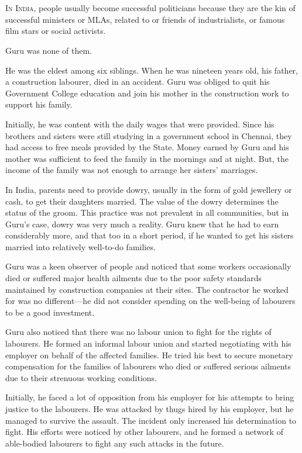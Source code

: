 \chapter{}

\lettrine{I}{n India}, people usually become successful politicians because they are the kin
of successful ministers or MLAs, related to or friends of industrialists, or famous
film stars or social activists.

Guru was none of them.

He was the eldest among six siblings. When he was nineteen years old, his
father, a construction labourer, died in an accident. Guru was obliged to quit
his Government College education and join his mother in the construction work
to support his family.

Initially, he was content with the daily wages that were provided. Since his
brothers and sisters were still studying in a government school in Chennai,
they had access to free meals provided by the State. Money earned by Guru and
his mother was sufficient to feed the family in the mornings and at night.
But, the income of the family was not enough to arrange her sisters' marriages.

In India, parents need to provide dowry, usually in the form of gold jewellery
or cash, to get their
daughters married. The value of the dowry determines the status of the groom.
This practice was not prevalent in all communities, but in Guru's case, dowry
was very much a reality. Guru knew that he had to earn considerably more, and that
too in a short period, if he wanted to get his sisters married into
relatively well-to-do families.

Guru was a keen observer of people and noticed that some workers occasionally
died or suffered major health ailments due to the poor safety standards
maintained by construction companies at their sites. The contractor he worked
for was no different—he did not consider spending
on the well-being of labourers to be a good investment.

Guru also noticed that there was no labour union to fight for the
rights of labourers. He formed an informal labour union and started negotiating
with his employer on behalf of the affected families. He tried his best to
secure monetary compensation for the families of labourers who died or suffered
serious ailments due to their strenuous working conditions.

Initially, he faced a lot of opposition from his employer for his attempts to
bring justice to the labourers. He was attacked by thugs hired by his employer,
but he managed to survive the assault. The incident only increased his
determination to fight. His efforts were noticed by other labourers, and he formed
a network of able-bodied labourers to fight any such attacks in the
future.

